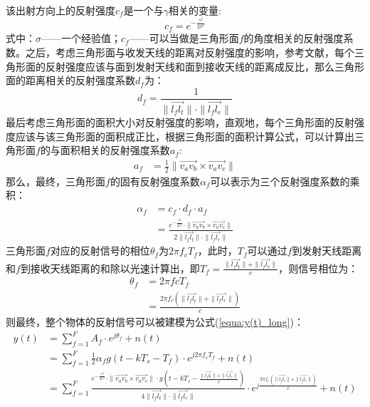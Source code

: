 该出射方向上的反射强度$c_{f}$是一个与$\gamma$相关的变量:
\begin{equation}
    c_{f} = e^{-\frac{\gamma^2}{2\sigma^2}}
\end{equation}
式中：$\sigma$——一个经验值；$c_{f}$——可以当做是三角形面$f$的角度相关的反射强度系数。之后，考虑三角形面与收发天线的距离对反射强度的影响，参考文献\cite{xue2023towards}，每个三角形面的反射强度应该与面到发射天线和面到接收天线的距离成反比，那么三角形面的距离相关的反射强度系数$d_{f}$为：
\begin{equation}
d_{f} = \frac{1}{\|\overrightarrow{l_f l_t} \|\cdot\|\overrightarrow{l_f l_r}\|}
\end{equation}
最后考虑三角形面的面积大小对反射强度的影响，直观地，每个三角形面的反射强度应该与该三角形面的面积成正比，根据三角形面的面积计算公式，可以计算出三角形面$f$的与面积相关的反射强度系数$a_{f}$:
\begin{equation}
    \begin{aligned}
        a_{f} &= \frac{1}{2} \|\overrightarrow{v_a v_b}\times \overrightarrow{v_a v_c}\|
    \end{aligned}
\end{equation}
那么，最终，三角形面$f$的固有反射强度系数$\alpha_f$可以表示为三个反射强度系数的乘积：
\begin{equation}
    \begin{aligned}
        \alpha_f &= c_f \cdot d_f \cdot a_f \\
                 &= \frac{e^{-\frac{\gamma^2}{2\sigma^2}}\cdot \|\overrightarrow{v_a v_b}\times \overrightarrow{v_a v_c}\|}{2\|\overrightarrow{l_f l_t} \|\cdot\|\overrightarrow{l_f l_r}\|} 
    \end{aligned}
\end{equation}
三角形面$f$对应的反射信号的相位$\theta_f$为$2\pi f_cT_f$，此时，$T_f$可以通过$f$到发射天线距离和$f$到接收天线距离的和除以光速计算出，即$T_f = \frac{\|\overrightarrow{l_f l_t}\|+\|\overrightarrow{l_f l_r}\|}{c}$，则信号相位为：
\begin{equation}
    \begin{aligned}
        \theta_f &= 2\pi fc T_f \\
                 &= \frac{2\pi f_c\left(\|\overrightarrow{l_f l_t}\|+\|\overrightarrow{l_f l_r}\|\right)}{c}
    \end{aligned}
\end{equation}
则最终，整个物体的反射信号可以被建模为公式(\ref{equa:y(t)_long})：
\begin{equation}
    \label{equa:y(t)_long}
    \begin{aligned}
        y(t) &= \sum_{f=1}^{F}A_{f}\cdot e^{j\theta_f} + n(t)\\
        &= \sum_{f=1}^{F}\frac{1}{2}\alpha_f g(t-kT_s-T_f)\cdot e^{j2\pi f_cT_f} +n(t)\\
        &= \sum_{f=1}^{F} \frac{e^{-\frac{\gamma^2}{2\sigma^2}}\cdot \|\overrightarrow{v_a v_b}\times \overrightarrow{v_a v_c}\| \cdot g\left(t-kT_s-\frac{\|\overrightarrow{l_f l_t}\|+\|\overrightarrow{l_f l_r}\|}{c} \right)} {4\|\overrightarrow{l_f l_t} \|\cdot\|\overrightarrow{l_f l_r }\|}  \cdot e^{j\frac{2\pi f_c\left(\|\overrightarrow{l_f l_t}\|+\|\overrightarrow{l_f l_r}\|\right)}{c}} + n(t)
    \end{aligned}
\end{equation}
